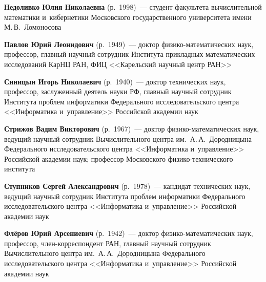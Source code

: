 \begin{multicols}{2}
   \vspace*{3pt}
   
\noindent
\textbf{Недоливко Юлия Николаевна} (р.\ 1998)~--- 
студент факультета вычислительной математики и~кибернетики Московского государственного университета 
имени М.\,В.~Ломоносова

   \vspace*{3pt}

   
\noindent
\textbf{Павлов Юрий Леонидович} (р.\ 1949)~--- доктор фи\-зи\-ко-ма\-те\-ма\-ти\-че\-ских наук, 
профессор, главный научный сотрудник Института прикладных ма\-те\-матических исследований
КарНЦ РАН, ФИЦ  <<Карельский научный центр РАН>>

   \vspace*{3pt}
   
\noindent
\textbf{Синицын Игорь Николаевич} (р.\ 1940)~--- 
доктор технических наук, профессор, заслуженный деятель науки РФ, 
главный научный сотрудник Института проб\-лем информатики Федерального исследовательского 
цент\-ра <<Информатика и~управ\-ле\-ние>> Российской академии наук

   \vspace*{3pt}
   
\noindent
\textbf{Стрижов Вадим Викторович} (р.\ 1967)~--- доктор фи\-зи\-ко-ма\-те\-ма\-ти\-че\-ских наук, 
ведущий научный сотрудник Вычислительного цент\-ра им.\ А.\,А.~Дородницына Федерального 
исследовательского цент\-ра <<Информатика и~управ\-ле\-ние>>
Российской академии наук; профессор Московского фи\-зи\-ко-тех\-ни\-че\-ско\-го института

   \vspace*{3.5pt}
   

\noindent
  \textbf{Ступников Сергей Александрович} (р.\ 1978)~--- кандидат технических наук, 
  ведущий научный сотрудник Института проб\-лем информатики Федерального исследовательского цент\-ра 
  <<Информатика и~управ\-ле\-ние>> Российской академии наук

   \vspace*{3.5pt}
   
\noindent
\textbf{Флёров Юрий Арсениевич} (р.\ 1942)~--- 
 доктор фи\-зико-мате\-ма\-ти\-че\-ских наук, профессор, член-кор\-рес\-пон\-дент РАН,
главный научный сотрудник Вычисли\-тель\-но\-го цент\-ра им.\ А.\,А.~Дородницына 
Федерального исследовательского цент\-ра <<Информатика и~управ\-ле\-ние>> Российской академии наук

   \vspace*{3.5pt}
   

\end{multicols}
